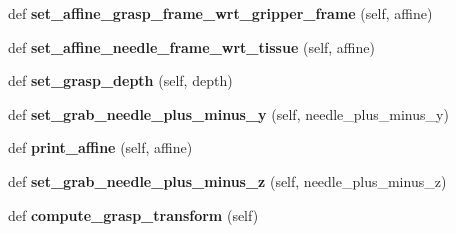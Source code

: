 \begin{DoxyCompactItemize}
\item 
def {\bfseries set\+\_\+affine\+\_\+grasp\+\_\+frame\+\_\+wrt\+\_\+gripper\+\_\+frame} (self, affine)\hypertarget{classneedle__planner__gripper__working_1_1needle__planner_ad52384534872c100ea2ff5dbce465358}{}\label{classneedle__planner__gripper__working_1_1needle__planner_ad52384534872c100ea2ff5dbce465358}

\item 
def {\bfseries set\+\_\+affine\+\_\+needle\+\_\+frame\+\_\+wrt\+\_\+tissue} (self, affine)\hypertarget{classneedle__planner__gripper__working_1_1needle__planner_a49010c52e0f55d64a9d6def77cab1e60}{}\label{classneedle__planner__gripper__working_1_1needle__planner_a49010c52e0f55d64a9d6def77cab1e60}

\item 
def {\bfseries set\+\_\+grasp\+\_\+depth} (self, depth)\hypertarget{classneedle__planner__gripper__working_1_1needle__planner_ab0c09f744f26624f82f2764592fc5984}{}\label{classneedle__planner__gripper__working_1_1needle__planner_ab0c09f744f26624f82f2764592fc5984}

\item 
def {\bfseries set\+\_\+grab\+\_\+needle\+\_\+plus\+\_\+minus\+\_\+y} (self, needle\+\_\+plus\+\_\+minus\+\_\+y)\hypertarget{classneedle__planner__gripper__working_1_1needle__planner_a77b0b2da137cb56492fcaab556ccb8ef}{}\label{classneedle__planner__gripper__working_1_1needle__planner_a77b0b2da137cb56492fcaab556ccb8ef}

\item 
def {\bfseries print\+\_\+affine} (self, affine)\hypertarget{classneedle__planner__gripper__working_1_1needle__planner_ab65516098d97a14c8ecda813de5e7b5f}{}\label{classneedle__planner__gripper__working_1_1needle__planner_ab65516098d97a14c8ecda813de5e7b5f}

\item 
def {\bfseries set\+\_\+grab\+\_\+needle\+\_\+plus\+\_\+minus\+\_\+z} (self, needle\+\_\+plus\+\_\+minus\+\_\+z)\hypertarget{classneedle__planner__gripper__working_1_1needle__planner_a460e2813805a373dfac526162217a6ed}{}\label{classneedle__planner__gripper__working_1_1needle__planner_a460e2813805a373dfac526162217a6ed}

\item 
def {\bfseries compute\+\_\+grasp\+\_\+transform} (self)\hypertarget{classneedle__planner__gripper__working_1_1needle__planner_a174fa37374948a4623dd7dc5be4eeb84}{}\label{classneedle__planner__gripper__working_1_1needle__planner_a174fa37374948a4623dd7dc5be4eeb84}


\end{DoxyCompactItemize}
